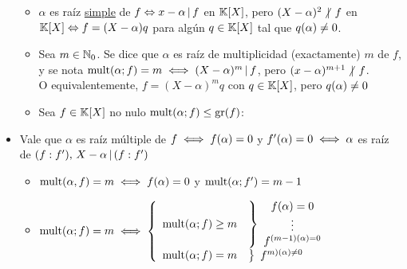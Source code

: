 \begin{itemize}
\begin{itemize}
		      \item $\alpha$ es raíz \underline{simple} de $f \sii x - \alpha \divideA f$ en $\K[X]$,
		            pero $(X - \alpha)^2 \noDivide f$ en $\K[X] \sii f= (X - \alpha) q$
		            para algún $q \en \K[X]$ tal que $q(\alpha) \distinto 0$.

		      \item Sea $m \en \naturales_0$. Se dice que $\alpha$ es raíz de multiplicidad (exactamente)
		            $m$ de $f$, y se nota $\mult{\alpha;f} = m \sisolosi (X - \alpha)^m \divideA f$,
		            pero $(x - \alpha)^{m+1} \noDivide f$.\\
		            O equivalentemente, $f = (X - \alpha)^m q$ con $q \en \K[X]$,
		            pero $q(\alpha) \distinto 0$

		      \item Sea $f \en \K[X]$ no nulo $\mult{\alpha; f} \leq \gr{f}$:
	      \end{itemize}

	\item Vale que $\alpha$ es raíz múltiple de $f \sisolosi f(\alpha) = 0$ y $f'(\alpha) = 0 \sisolosi \alpha$
	      es raíz de $(f:f'),\, X - \alpha \divideA (f:f')$
	      \begin{itemize}
            \item $
              \mult{\alpha,f} = m 
              \sisolosi 
              f(\alpha) = 0$ y $\mult{\alpha;f'} = m-1$

		      \item $\mult{\alpha;f} = m \sisolosi
			            \llave{rl}{
				            \mult{\alpha;f}\geq m     &
				            \llaveInv{c}{
					            f(\alpha) = 0\\
					            \vdots\\
					            f^{(m-1)(\alpha) = 0}
				            }\\
				            \mult{\alpha;f} = m     &
				            \llaveInv{c}{
					            f^{m)(\alpha) \distinto 0}
				            }
			            }$
	      \end{itemize}
\end{itemize}
